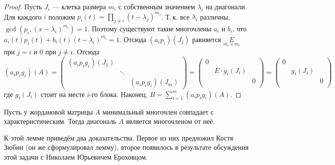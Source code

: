 \begin{proof}
    Пусть $J_i$ --- клетка размера $m_i$ с собственным значением $\lambda_i$ на диагонали. Для каждого $i$ положим $p_i(t) = \prod\limits_{j \ne i}(t - \lambda_j)^{m_j}$. Т.\,к. все $\lambda_i$ различны, $\gcd(p_i, (x - \lambda_i)^{m_i}) = 1$. Поэтому существуют такие многочлены $a_i$ и $b_i$, что $a_i(t)p_i(t) + b_i(t)(t - \lambda_i)^{m_i} = 1$. Отсюда $(a_ip_i)(J_{j})$ равняется $\underset{m_i \times m_i}{E}$ при $j = i$ и $0$ при $j \ne i$. Отсюда
    \[
        (a_ip_ig_i)(A) =
        \begin{pmatrix}
            (a_ip_ig_i)(J_1) & & \\
             & \ddots & \\
             & & (a_ip_ig_i)(J_m)
        \end{pmatrix} = 
        \begin{pmatrix}
            0 & & \\
            & E \cdot g_i(J_i) & \\
             & & 0\\
        \end{pmatrix} =
        \begin{pmatrix}
            0 & & \\
            & g_i(J_i) & \\
             & & 0\\
        \end{pmatrix}
    \]
    где $g_i(J_i)$ стоит на месте $i$-го блока. Наконец, $B = \sum\limits_{i = 1}^m(a_ip_ig_i)(A)$.
\end{proof}

\begin{lemma}
    Пусть у жордановой матрицы $A$ минимальный многочлен совпадает с характеристическим. Тогда диагональ $A$ является многочленом от неё.
\end{lemma}

К этой лемме приведём два доказательства. Первое из них предложил Костя Зюбин (он же сформулировал лемму), второе появилось в результате обсуждения этой задачи с Николаем Юрьевичем Ероховцом.

